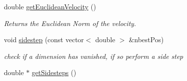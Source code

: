 \begin{CompactItemize}
double \hyperlink{classBird_0f8704555e859618ae188841f2ab0efe}{getEuclideanVelocity} ()
\begin{CompactList}\small\item\em Returns the Euclidean Norm of the velocity. \item\end{CompactList}\item 
void \hyperlink{classBird_f93673932c41319e7488cb6f5e509ddc}{sidestep} (const vector$<$ double $>$ \&nbestPos)
\begin{CompactList}\small\item\em check if a dimension has vanished, if so perform a side step \item\end{CompactList}\item 
double $\ast$ \hyperlink{classBird_6ed8acd5fb90432d021ae8b1d7dcb383}{getSidesteps} ()
\end{CompactItemize}
